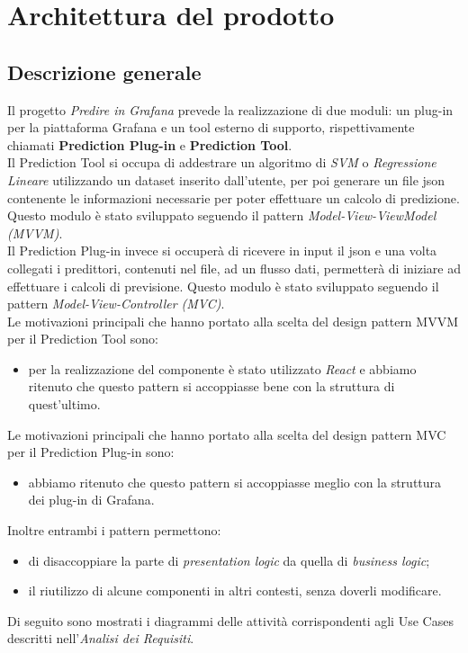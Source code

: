 \section{Architettura del prodotto}

\subsection{Descrizione generale}
Il progetto \textit{Predire in Grafana} prevede la realizzazione di due moduli: un plug-in per la piattaforma Grafana e un tool esterno di supporto, rispettivamente chiamati \textbf{Prediction Plug-in} e \textbf{Prediction Tool}. \\
Il Prediction Tool si occupa di addestrare un algoritmo di \textit{SVM} o \textit{Regressione Lineare} utilizzando un dataset inserito dall'utente, per poi generare un file json contenente le informazioni necessarie per poter effettuare un calcolo di predizione. Questo modulo è stato sviluppato seguendo il pattern \textit{Model-View-ViewModel (MVVM)}.\\
Il Prediction Plug-in invece si occuperà di ricevere in input il json e una volta collegati i predittori, contenuti nel file, ad un flusso dati, permetterà di iniziare ad effettuare i calcoli di previsione. Questo modulo è stato sviluppato seguendo il pattern \textit{Model-View-Controller (MVC)}.\\
Le motivazioni principali che hanno portato alla scelta del design pattern MVVM per il Prediction Tool sono:
\begin{itemize}
	\item per la realizzazione del componente è stato utilizzato \textit{React} e abbiamo ritenuto che questo pattern si accoppiasse bene con la struttura di quest'ultimo.
\end{itemize}
Le motivazioni principali che hanno portato alla scelta del design pattern MVC per il Prediction Plug-in sono:
\begin{itemize}
	\item abbiamo ritenuto che questo pattern si accoppiasse meglio con la struttura dei plug-in di Grafana.
\end{itemize}
Inoltre entrambi i pattern permettono:
\begin{itemize}
	\item di disaccoppiare la parte di \textit{presentation logic} da quella di \textit{business logic};
	\item il riutilizzo di alcune componenti in altri contesti, senza doverli modificare.
\end{itemize}
Di seguito sono mostrati i diagrammi delle attività corrispondenti agli Use Cases descritti nell'\textit{Analisi dei Requisiti}.


